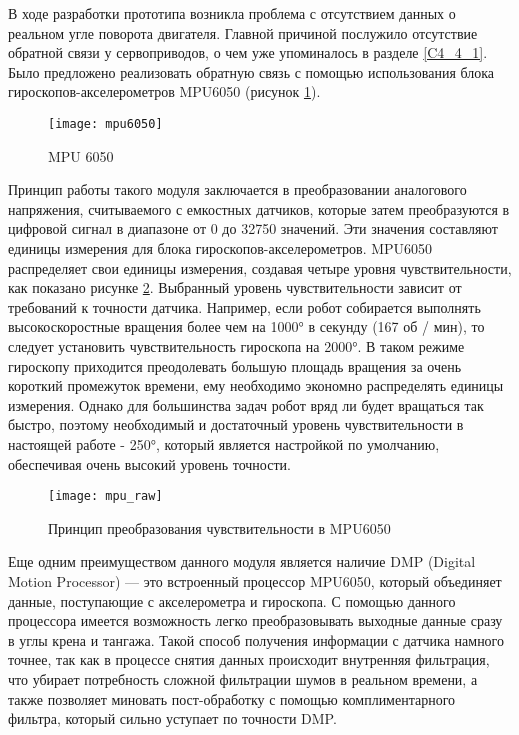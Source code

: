 В ходе разработки прототипа возникла проблема с отсутствием данных о реальном угле поворота двигателя. Главной причиной послужило отсутствие обратной связи у сервоприводов, о чем уже упоминалось в разделе \ref{C4_4_1}. Было предложено реализовать обратную связь с помощью использования блока гироскопов-акселерометров MPU6050 (рисунок \ref{mpu6050}).

\begin{figure}[h!]
	\begin{center}
		\texttt{[image: mpu6050]}
		\caption{MPU 6050}
		\label{mpu6050}
	\end{center}
\end{figure}

Принцип работы такого модуля заключается в преобразовании аналогового напряжения, считываемого с емкостных датчиков, которые затем преобразуются в цифровой сигнал в диапазоне от 0 до 32750 значений. Эти значения составляют единицы измерения для блока гироскопов-акселерометров. MPU6050 распределяет свои единицы измерения, создавая четыре уровня чувствительности, как показано рисунке \ref{mpu_raw}. Выбранный уровень чувствительности зависит от требований к точности датчика. Например, если робот собирается выполнять высокоскоростные вращения более чем на 1000° в секунду (167 об / мин), то следует установить чувствительность гироскопа на 2000°. В таком режиме гироскопу приходится преодолевать большую площадь вращения за очень короткий промежуток времени, ему необходимо экономно распределять единицы измерения. Однако для большинства задач робот вряд ли будет вращаться так быстро, поэтому необходимый и достаточный уровень чувствительности в настоящей работе - 250°, который является настройкой по умолчанию, обеспечивая очень высокий уровень точности.

\begin{figure}[h]
	\begin{center}
		\texttt{[image: mpu\_raw]}
		\caption{Принцип преобразования чувствительности в MPU6050}
		\label{mpu_raw}
	\end{center}
\end{figure}
\newpage

Еще одним преимуществом данного модуля является наличие DMP (Digital Motion Processor) --- это встроенный процессор MPU6050, который объединяет данные, поступающие с акселерометра и гироскопа. С помощью данного процессора имеется возможность легко преобразовывать выходные данные сразу в углы крена и тангажа. Такой способ получения информации с датчика намного точнее, так как в процессе снятия данных происходит внутренняя фильтрация, что убирает потребность сложной фильтрации шумов в реальном времени, а также позволяет миновать пост-обработку с помощью комплиментарного фильтра, который сильно уступает по точности DMP.



